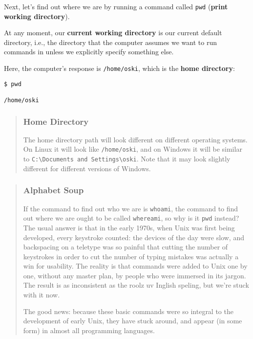 \documentclass[
]{book}
\begin{document}
Next, let's find out where we are by running a command called \texttt{pwd} (\textbf{print working directory}).

At any moment, our \textbf{current working directory} is our current default directory, i.e., the directory that the computer assumes we want to run commands in unless we explicitly specify something else.

Here, the computer's response is \texttt{/home/oski}, which is the \textbf{home directory}:

\begin{verbatim}
$ pwd

/home/oski
\end{verbatim}

\begin{quote}
\hypertarget{home-directory}{%
\subsubsection{Home Directory}\label{home-directory}}

The home directory path will look different on different operating systems. On Linux it will look like \texttt{/home/oski}, and on Windows it will be similar to \texttt{C:\textbackslash{}Documents\ and\ Settings\textbackslash{}oski}. Note that it may look slightly different for different versions of Windows.
\end{quote}

\begin{quote}
\hypertarget{alphabet-soup}{%
\subsubsection{Alphabet Soup}\label{alphabet-soup}}

If the command to find out who we are is \texttt{whoami}, the command to find out where we are ought to be called \texttt{whereami}, so why is it \texttt{pwd} instead? The usual answer is that in the early 1970s, when Unix was
first being developed, every keystroke counted: the devices of the day were slow, and backspacing on a teletype was so painful that cutting the number of keystrokes in order to cut the number of typing mistakes was actually a win for usability. The reality is that commands were added to Unix one by one, without any master plan, by people who were immersed in its jargon. The result is as inconsistent as the roolz uv Inglish speling, but we're stuck with it now.

The good news: because these basic commands were so integral to the development of early Unix, they have stuck around, and appear (in some form) in almost all programming languages.
\end{quote}
\end{document}
